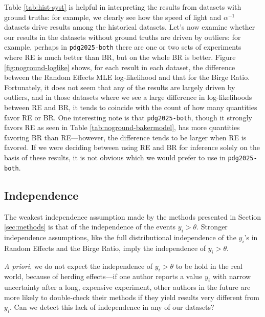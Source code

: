\documentclass[letterpaper,12pt]{article}
\begin{document}
Table \ref{tab:hist-syst} is helpful in interpreting the results from datasets with ground truths: for example, we clearly see how the speed of light and $\alpha^{-1}$ datasets drive results among the historical datasets. Let's now examine whether our results in the datasets without ground truths are driven by outliers: for example, perhaps in \texttt{pdg2025-both} there are one or two sets of experiments where RE is much better than BR, but on the whole BR is better. Figure \ref{fig:noground-loglike} shows, for each result in each dataset, the difference between the Random Effects MLE log-likelihood and that for the Birge Ratio. Fortunately, it does not seem that any of the results are largely driven by outliers, and in those datasets where we see a large difference in log-likelihoods between RE and BR, it tends to coincide with the count of how many quantities favor RE or BR. One interesting note is that \texttt{pdg2025-both}, though it strongly favors RE as seen in Table \ref{tab:noground-bakermodel}, has more quantities favoring BR than RE---however, the difference tends to be larger when RE is favored. If we were deciding between using RE and BR for inference solely on the basis of these results, it is not obvious which we would prefer to use in \texttt{pdg2025-both}.

\subsection{Independence}\label{sec:independence}

The weakest independence assumption made by the methods presented in Section \ref{sec:methods} is that of the independence of the events $y_i>\theta$. Stronger independence assumptions, like the full distributional independence of the $y_i$'s in Random Effects and the Birge Ratio, imply the independence of $y_i>\theta$.

\textit{A priori}, we do not expect the independence of $y_i>\theta$ to be hold in the real world, because of herding effects---if one author reports a value $y_i$ with narrow uncertainty after a long, expensive experiment, other authors in the future are more likely to double-check their methods if they yield results very different from $y_i$. Can we detect this lack of independence in any of our datasets?
\end{document}
